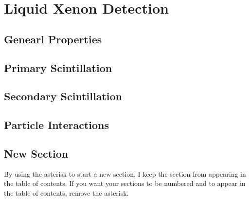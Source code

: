 

\chapter[Liquid Xenon and Time Projection Chambers][Liquid Xenon Detection]{Liquid Xenon Detection}
\label{chap:liquid_xe}




\section{Genearl Properties}
\label{sec:properties}



\section{Primary Scintillation}
\label{sec:primary_scintillation}



\section{Secondary Scintillation}
\label{sec:secondary_scintillation}



\section{Particle Interactions}
\label{sec:particles}

\section*{New Section}

By using the asterisk to start a new section, I keep the section from appearing in the table of contents.
If you want your sections to be numbered and to appear in the table of contents, remove the asterisk.

